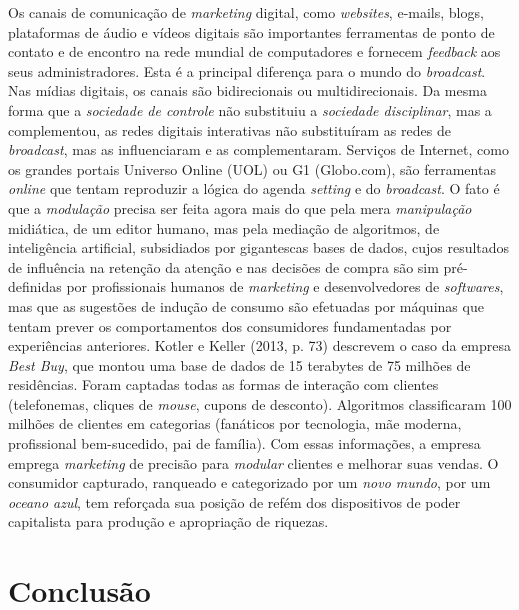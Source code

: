 Os canais de comunicação de \emph{marketing} digital, como
\emph{websites}, e-mails, blogs, plataformas de áudio e vídeos digitais
são importantes ferramentas de ponto de contato e de encontro na rede
mundial de computadores e fornecem \emph{feedback} aos seus
administradores. Esta é a principal diferença para o mundo do
\emph{broadcast}. Nas mídias digitais, os canais são bidirecionais ou
multidirecionais. Da mesma forma que a \emph{sociedade de controle} não
substituiu a \emph{sociedade disciplinar}, mas a complementou, as redes
digitais interativas não substituíram as redes de \emph{broadcast}, mas
as influenciaram e as complementaram. Serviços de Internet, como os
grandes portais Universo Online (UOL) ou G1 (Globo.com), são ferramentas
\emph{online} que tentam reproduzir a lógica do agenda \emph{setting} e
do \emph{broadcast}. O fato é que a \emph{modulação} precisa ser feita
agora mais do que pela mera \emph{manipulação} midiática, de um editor
humano, mas pela mediação de algoritmos, de inteligência artificial,
subsidiados por gigantescas bases de dados, cujos resultados de
influência na retenção da atenção e nas decisões de compra são sim
pré-definidas por profissionais humanos de \emph{marketing} e
desenvolvedores de \emph{softwares}, mas que as sugestões de indução de
consumo são efetuadas por máquinas que tentam prever os comportamentos
dos consumidores fundamentadas por experiências anteriores. Kotler e
Keller (2013, p. 73) descrevem o caso da empresa \emph{Best Buy}, que
montou uma base de dados de 15 terabytes de 75 milhões de residências.
Foram captadas todas as formas de interação com clientes (telefonemas,
cliques de \emph{mouse}, cupons de desconto). Algoritmos classificaram
100 milhões de clientes em categorias (fanáticos por tecnologia, mãe
moderna, profissional bem-sucedido, pai de família). Com essas
informações, a empresa emprega \emph{marketing} de precisão para
\emph{modular} clientes e melhorar suas vendas. O consumidor capturado,
ranqueado e categorizado por um \emph{novo mundo}, por um \emph{oceano
azul}, tem reforçada sua posição de refém dos dispositivos de poder
capitalista para produção e apropriação de riquezas.

\section{Conclusão}

